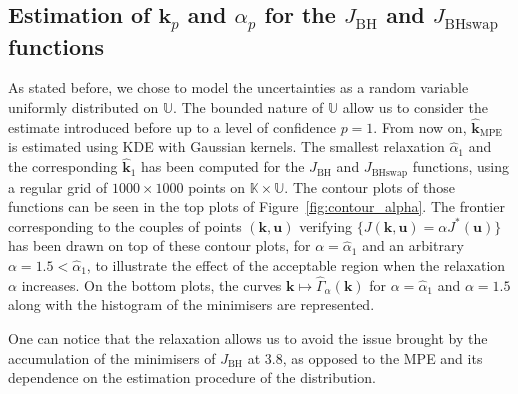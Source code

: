 \documentclass[preprint, 1p]{elsarticle}
\newcommand{\hatkmpe}{\hat{\mathbf{k}}_{\mathrm{MPE}}}
\newcommand{\checkap}{{\alpha}_p}
\newcommand{\checka}{{\alpha}}
\newcommand{\checkk}{\mathbf{k}}
\newcommand{\checkkp}{{\mathbf{k}}_p}
\newcommand{\Kspace}{\mathbb{K}}
\newcommand{\Uspace}{\mathbb{U}}
\newcommand{\JBH}{J_{\mathrm{BH}}}
\begin{document}



\subsection{Estimation of $\checkkp$ and $\checkap$ for the $J_{\mathrm{BH}}$ and $J_{\mathrm{BHswap}}$ functions}
As stated before, we chose to model the uncertainties as a random variable uniformly distributed on $\Uspace$. The bounded nature of $\Uspace$ allow us to consider the estimate introduced before up to a level of confidence $p=1$.
From now on, $\hatkmpe$ is estimated using KDE with Gaussian kernels.
The smallest relaxation $\hat{\checka}_1$ and the corresponding $\hat{\checkk}_1$ has been computed for the $J_{\mathrm{BH}}$ and $J_{\mathrm{BHswap}}$ functions, using a regular grid of $1000 \times 1000$ points on $\Kspace\times\Uspace$. The contour plots of those functions can be seen in the top plots of Figure~\ref{fig:contour_alpha}. The frontier corresponding to the couples of points $(\mathbf{k},\mathbf{u})$ verifying $\{J(\mathbf{k},\mathbf{u}) = \alpha J^*(\mathbf{u})\}$ has been drawn on top of these contour plots, for $\alpha=\hat{\checka}_1$ and an arbitrary $\alpha=1.5<\hat{\checka}_1$, to illustrate the effect of the acceptable region when the relaxation $\alpha$ increases. 
On the bottom plots, the curves $\mathbf{k}\mapsto \hat{\Gamma}_{\alpha}(\mathbf{k})$ for $\alpha=\hat{\checka}_1$ and $\alpha=1.5$ along with the histogram of the minimisers are represented.


One can notice that the relaxation allows us to avoid the issue brought by the accumulation of the minimisers of $\JBH$ at $3.8$, as opposed to the MPE and its dependence on the estimation procedure of the distribution.
\end{document}
